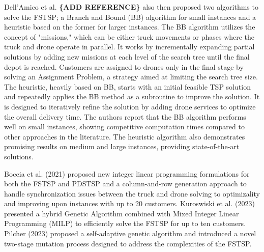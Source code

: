 \documentclass{article}
\begin{document}
	\par
	Dell'Amico et al. \textbf{\{ADD REFERENCE\}} also then proposed two algorithms to solve the FSTSP; a Branch and Bound (BB) algorithm for small instances and a heuristic based on the former for larger instances. The BB algorithm utilizes the concept of "missions," which can be either truck movements or phases where the truck and drone operate in parallel. It works by incrementally expanding partial solutions by adding new missions at each level of the search tree until the final depot is reached. Customers are assigned to drones only in the final stage by solving an Assignment Problem, a strategy aimed at limiting the search tree size. The heuristic, heavily based on BB, starts with an initial feasible TSP solution and repeatedly applies the BB method as a subroutine to improve the solution. It is designed to iteratively refine the solution by adding drone services to optimize the overall delivery time. The authors report that the BB algorithm performs well on small instances, showing competitive computation times compared to other approaches in the literature. The heuristic algorithm also demonstrates promising results on medium and large instances, providing state-of-the-art solutions.
	
	\par
	 Boccia et al. (2021) proposed  new integer linear programming formulations for both the FSTSP and PDSTSP and a column-and-row generation approach to handle synchronization issues between the truck and drone solving to optimizality and improving upon instances with up to 20 customers. Kuroswiski et al. (2023) presented a hybrid Genetic Algorithm combined with Mixed Integer Linear Programming (MILP) to efficiently solve the FSTSP for up to ten customers. Pilcher (2023) proposed a self-adaptive genetic algorithm and introduced a novel two-stage mutation process designed to address the complexities of the FSTSP. 
	
	
\end{document}
